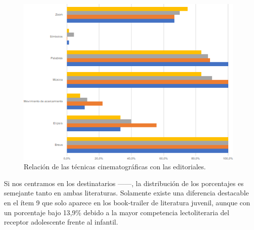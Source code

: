 \documentclass[spanish]{textolivre}
\begin{document}
\begin{figure}[htbp]
\centering
\begin{minipage}{.8\textwidth}
 \includegraphics[width=\textwidth]{figura03.png}
 \caption{Relación de las técnicas cinematográficas con las editoriales.}
 \label{fig03}
\end{minipage}
\end{figure}

Si nos centramos en los destinatarios ——, la distribución de los porcentajes es semejante tanto en ambas literaturas. Solamente existe una diferencia destacable en el ítem 9 que solo aparece en los book-trailer de literatura juvenil, aunque con un porcentaje bajo 13,9\% debido a la mayor competencia lectoliteraria del receptor adolescente frente al infantil.
\end{document}
